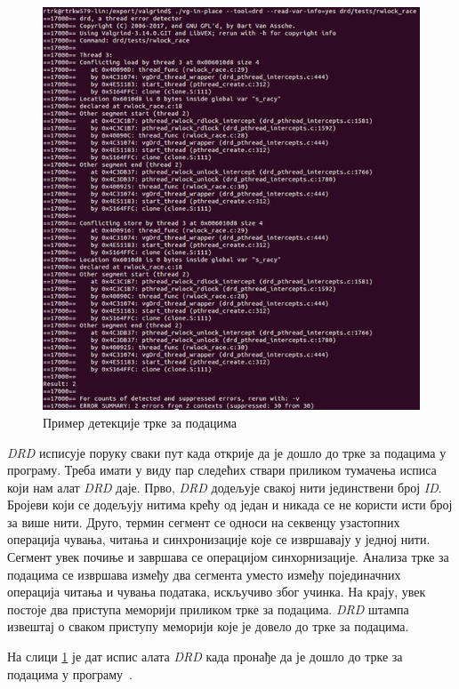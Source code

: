 \documentclass[12pt,oneside]{memoir}
\begin{document}
\begin{figure}[h!]
\begin{center}
\includegraphics[scale=0.75]{slika20.png}
\end{center}
\caption{Пример детекције трке за подацима}
\label{fig:drd-data-race}
\end{figure}

\indent \textit{DRD} исписује поруку сваки пут када открије да је дошло до трке за подацима у програму. Треба имати у виду пар следећих ствари приликом тумачења исписа који нам алат \textit{DRD} даје. Прво, \textit{DRD} додељује свакој нити јединствени број \textit{ID}. Бројеви који се додељују нитима крећу од један и никада се не користи исти број за више нити. Друго, термин сегмент се односи на секвенцу узастопних операција чувања, читања и синхронизације које се извршавају у једној нити. Сегмент увек почиње и завршава се операцијом синхорнизације. Анализа трке за подацима се извршава између два сегмента уместо између појединачних операција читања и чувања података, искључиво због учинка. На крају, увек постоје два приступа меморији приликом трке за подацима. \textit{DRD} штампа извештај о сваком приступу меморији које је довело до трке за подацима.

\indent На слици \ref{fig:drd-data-race} је дат испис алата \textit{DRD} када пронађе да је дошло до трке за подацима у програму~\cite{drdRef}.
\end{document}

